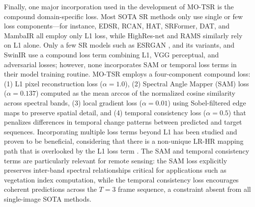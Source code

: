         Finally, one major incorporation used in the development of MO-TSR is the compound domain-specific loss. Most SOTA SR methods only use single or few loss components---for instance, EDSR, RCAN, HAT, SRFormer, DAT, and MambaIR all employ only L1 loss, while HighRes-net and RAMS similarly rely on L1 alone. Only a few SR models such as ESRGAN \citep{wang2018esrganenhancedsuperresolutiongenerative}, and its variants, and SwinIR \citep{liang2021swinirimagerestorationusing} use a compound loss term combining L1, VGG perceptual, and adversarial losses; however, none incorporates SAM or temporal loss terms in their model training routine. MO-TSR employs a four-component compound loss: (1) L1 pixel reconstruction loss ($\alpha = 1.0$), (2) Spectral Angle Mapper (SAM) loss ($\alpha = 0.137$) computed as the mean arccos of the normalized cosine similarity across spectral bands, (3) local gradient loss ($\alpha = 0.01$) using Sobel-filtered edge maps to preserve spatial detail, and (4) temporal consistency loss ($\alpha = 0.5$) that penalizes differences in temporal change patterns between predicted and target sequences. Incorporating multiple loss terms beyond L1 has been studied and proven to be beneficial, considering that there is a non-unique LR-HR mapping path that is overlooked by the L1 loss term \citep{he2023revisitingl1losssuperresolution}. The SAM and temporal consistency terms are particularly relevant for remote sensing: the SAM loss explicitly preserves inter-band spectral relationships critical for applications such as vegetation index computation, while the temporal consistency loss encourages coherent predictions across the $T = 3$ frame sequence, a constraint absent from all single-image SOTA methods.
